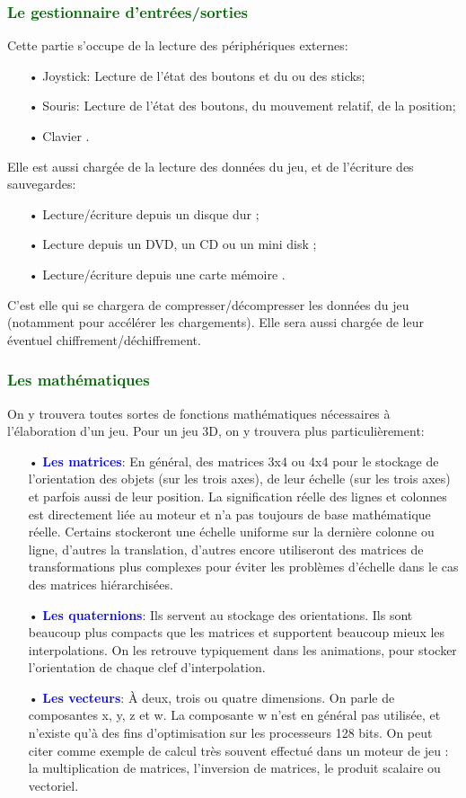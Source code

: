 \documentclass[ebook, 8pt, oneside, openany]{memoir}
\begin{document}
	\subsubsection{\textcolor{darkgreen}{Le gestionnaire d'entrées/sorties}}
	Cette partie s'occupe de la lecture des périphériques externes:
	\begin{itemize}
		\item[• Joystick:] Lecture de l'état des boutons et du ou des sticks;
		\item[• Souris:] Lecture de l'état des boutons, du mouvement relatif, de la position;
		\item[• Clavier].
	\end{itemize}
	Elle est aussi chargée de la lecture des données du jeu, et de l'écriture des sauvegardes:
	\begin{itemize}
		\item[• Lecture/écriture depuis un disque dur];
		\item[• Lecture depuis un DVD, un CD ou un mini disk];
		\item[• Lecture/écriture depuis une carte mémoire].
	\end{itemize}
	C'est elle qui se chargera de compresser/décompresser les données du jeu (notamment pour accélérer les
	chargements). Elle sera aussi chargée de leur éventuel chiffrement/déchiffrement.
	\subsubsection{\textcolor{darkgreen}{Les mathématiques}}
	On y trouvera toutes sortes de fonctions mathématiques nécessaires à l'élaboration d'un jeu. Pour un jeu 
	3D, on y trouvera plus particulièrement:
	\begin{itemize}
		\item[• \textbf{\textcolor{blue}{Les matrices}}:] En général, des matrices 3x4 ou 4x4 pour le
		stockage de l'orientation des objets (sur les trois axes), de leur échelle (sur les trois axes) et
		parfois aussi de leur position. La signification réelle des lignes et colonnes est directement liée
		au moteur et n'a pas toujours de base mathématique réelle. Certains stockeront une échelle uniforme
		sur la dernière colonne ou ligne, d'autres la translation, d'autres encore utiliseront des matrices
		de transformations plus complexes pour éviter les problèmes d'échelle dans le cas des matrices
		hiérarchisées.
		\item[• \textbf{\textcolor{blue}{Les quaternions}}:] Ils servent au stockage des orientations. Ils
		sont beaucoup plus compacts que les matrices et supportent beaucoup mieux les interpolations. On les
		retrouve typiquement dans les animations, pour stocker l'orientation de chaque clef d'interpolation.
		\item[• \textbf{\textcolor{blue}{Les vecteurs}}:] À deux, trois ou quatre dimensions. On parle de
		composantes x, y, z et w. La composante w n'est en général pas utilisée, et n'existe qu'à des fins
		d'optimisation sur les processeurs 128 bits. On peut citer comme exemple de calcul très souvent
		effectué dans un moteur de jeu : la multiplication de matrices, l'inversion de matrices, le produit
		scalaire ou vectoriel.
	\end{itemize}
\end{document}
